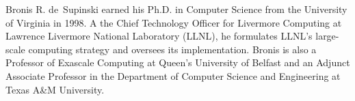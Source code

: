 \begin{IEEEbiography}{Bronis R. de~Supinski}
earned his Ph.D. in Computer Science from the University 
of Virginia in 1998. A the Chief Technology Officer for 
Livermore Computing at Lawrence Livermore National Laboratory 
(LLNL), he formulates LLNL's large-scale computing strategy 
and oversees its implementation. Bronis is also a Professor 
of Exascale Computing at Queen's University of Belfast and 
an Adjunct Associate Professor in the Department of Computer 
Science and Engineering at Texas A\&M University.
\end{IEEEbiography}

